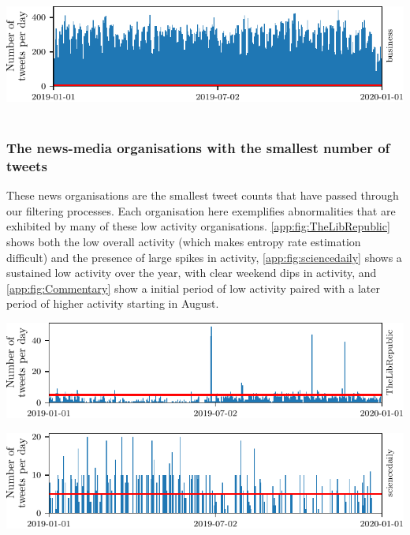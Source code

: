 \begin{center}

\includegraphics{appendix2/figs/tweet_times/business.pdf}~
\end{center}



\subsubsection{The news-media organisations with the smallest number of tweets}

These news organisations are the smallest tweet counts that have passed through our filtering processes. Each organisation here exemplifies abnormalities that are exhibited by many of these low activity organisations. \autoref{app:fig:TheLibRepublic} shows both the low overall activity (which makes entropy rate estimation difficult) and the presence of large spikes in activity, \autoref{app:fig:sciencedaily} shows a sustained low activity over the year, with clear weekend dips in activity, and \autoref{app:fig:Commentary} show a initial period of low activity paired with a later period of higher activity starting in August.

\begin{center}

\includegraphics{appendix2/figs/tweet_times/TheLibRepublic.pdf}
\label{app:fig:TheLibRepublic}
\end{center}

\begin{center}

\includegraphics{appendix2/figs/tweet_times/sciencedaily.pdf}
\label{app:fig:sciencedaily}
\end{center}{}

